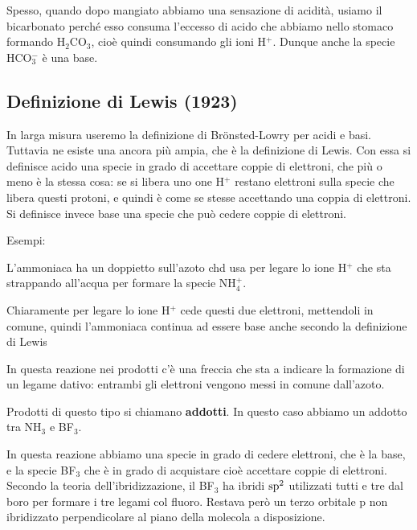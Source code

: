 Spesso, quando dopo mangiato abbiamo una sensazione di acidità, usiamo il bicarbonato perché esso consuma l'eccesso di acido che abbiamo nello stomaco formando H$_2$CO$_3$, cioè quindi consumando gli ioni H$^+$. Dunque anche la specie HCO$_3^-$ è una base.

\subsection{Definizione di Lewis (1923)}
In larga misura useremo la definizione di Brönsted-Lowry per acidi e basi. Tuttavia ne esiste una ancora più ampia, che è la definizione di Lewis. Con essa si definisce acido una specie in grado di accettare coppie di elettroni, che più o meno è la stessa cosa: se si libera uno one H$^+$ restano elettroni sulla specie che libera questi protoni, e quindi è come se stesse accettando una coppia di elettroni. Si definisce invece base una specie che può cedere coppie di elettroni.

\vspace{0.2cm}Esempi:

\vspace{0.2cm} 

\vspace{0.2cm}L'ammoniaca ha un doppietto sull'azoto chd usa per legare lo ione H$^+$ che sta strappando all'acqua per formare la specie NH$_4^+$.

Chiaramente per legare lo ione H$^+$ cede questi due elettroni, mettendoli in comune, quindi l'ammoniaca continua ad essere base anche secondo la definizione di Lewis

\vspace{0.2cm}  

\vspace{0.2cm}In questa reazione nei prodotti c'è una freccia che sta a indicare la formazione di un legame dativo: entrambi gli elettroni vengono messi in comune dall'azoto.

Prodotti di questo tipo si chiamano \textbf{addotti}. In questo caso abbiamo un addotto tra NH$_3$ e BF$_3$.

In questa reazione abbiamo una specie in grado di cedere elettroni, che è la base, e la specie BF$_3$ che è in grado di acquistare cioè accettare coppie di elettroni. Secondo la teoria dell'ibridizzazione, il BF$_3$ ha ibridi $\rm sp^2$ utilizzati tutti e tre dal boro per formare i tre legami col fluoro. Restava però un terzo orbitale p non ibridizzato perpendicolare al piano della molecola a disposizione.

